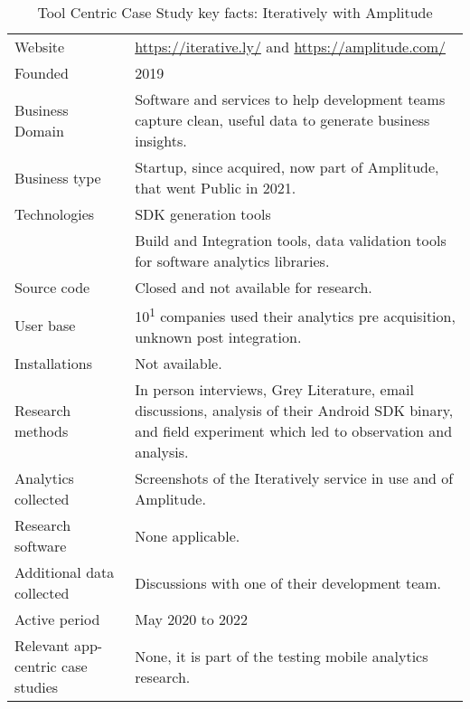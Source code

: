 {\renewcommand{\arraystretch}{0.8}%
\begin{table}[htbp!]
    \centering
    \small
    \setlength{\tabcolsep}{6pt}
    \begin{tabular}{lp{9cm}}
       \toprule
       Website &\url{https://iterative.ly/} and \url{https://amplitude.com/} \\
       Founded & 2019 \\ %
       Business Domain & Software and services to help development teams capture clean, useful data to generate business insights. \\ %
       Business type & Startup, since acquired, now part of Amplitude, that went Public in 2021. \\
       Technologies  & SDK generation tools \\
       & Build and Integration tools, data validation tools for software analytics libraries. \\
       Source code  &Closed and not available for research. \\
       \midrule
       User base & 10\textsuperscript{1} companies used their analytics pre acquisition, unknown post integration. \\
       Installations & Not available.  \\
       \midrule
       Research methods &In person interviews, Grey Literature, email discussions, analysis of their Android SDK binary, and field experiment which led to observation and analysis. \\
       Analytics collected & Screenshots of the Iteratively service in use and of Amplitude. \\
       Research software & None applicable. \\
       Additional data collected &Discussions with one of their development team. \\
       Active period & May 2020 to 2022 \\
       Relevant app-centric case studies & None, it is part of the testing mobile analytics research. \\
       \bottomrule
    \end{tabular}
    \caption{Tool Centric Case Study key facts: Iteratively with Amplitude}
    \label{tab:iteratively_with_amplitude_anaytics_overview}
\end{table}
}

